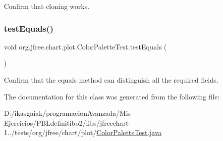 Confirm that cloning works. \mbox{\label{classorg_1_1jfree_1_1chart_1_1plot_1_1_color_palette_test_a5ac6e86e29b9ceb11319e11c60803f6d}} 
\subsubsection{\texorpdfstring{test\+Equals()}{testEquals()}}
{\footnotesize\ttfamily void org.\+jfree.\+chart.\+plot.\+Color\+Palette\+Test.\+test\+Equals (\begin{DoxyParamCaption}{ }\end{DoxyParamCaption})}

Confirm that the equals method can distinguish all the required fields. 

The documentation for this class was generated from the following file\+:\begin{DoxyCompactItemize}
\item 
D\+:/ikasgaiak/programacion\+Avanzada/\+Mis Ejercicios/\+P\+B\+Ldefinitibo2/libs/jfreechart-\/1../tests/org/jfree/chart/plot/\mbox{\hyperlink{_color_palette_test_8java}{Color\+Palette\+Test.\+java}}\end{DoxyCompactItemize}
